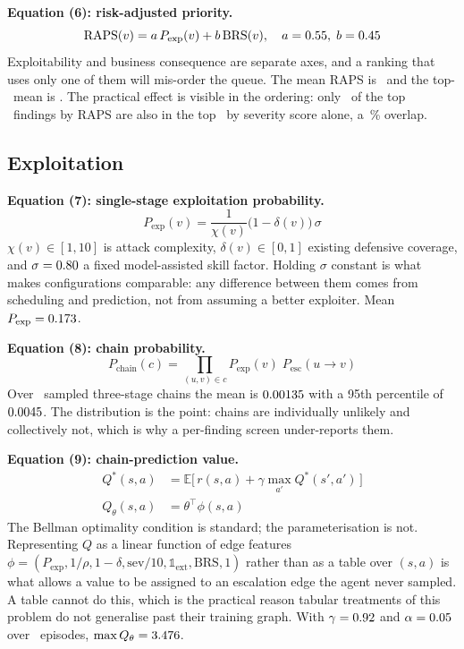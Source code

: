 \documentclass[journal]{IEEEtran}
\begin{document}
\textbf{Equation (6): risk-adjusted priority.}
\begin{equation}
  \mathrm{RAPS}(v) = a\,P_{\mathrm{exp}}(v) + b\,\mathrm{BRS}(v),
  \quad a=0.55,\; b=0.45
  \label{eq:raps}
\end{equation}
Exploitability and business consequence are separate axes, and a ranking that
uses only one of them will mis-order the queue. The mean RAPS is \rapsMean\
and the top-\topK\ mean is \rapsTop. The practical effect is visible in the
ordering: only \rankOverlap\ of the top \topK\ findings by RAPS are also in
the top \topK\ by severity score alone, a \rankOverlapPct\,\% overlap.

\subsection{Exploitation}

\textbf{Equation (7): single-stage exploitation probability.}
\begin{equation}
  P_{\mathrm{exp}}(v) = \frac{1}{\chi(v)}\bigl(1-\delta(v)\bigr)\,\sigma
  \label{eq:exploit}
\end{equation}
$\chi(v)\in[1,10]$ is attack complexity, $\delta(v)\in[0,1]$ existing defensive
coverage, and $\sigma=0.80$ a fixed model-assisted skill factor. Holding
$\sigma$ constant is what makes configurations comparable: any difference
between them comes from scheduling and prediction, not from assuming a better
exploiter. Mean $P_{\mathrm{exp}}=0.173$.

\textbf{Equation (8): chain probability.}
\begin{equation}
  P_{\mathrm{chain}}(c) = \prod_{(u,v)\in c}
      P_{\mathrm{exp}}(v)\; P_{\mathrm{esc}}(u \!\to\! v)
  \label{eq:chain}
\end{equation}
Over \nChains\ sampled three-stage chains the mean is $0.00135$ with a
95th percentile of $0.0045$. The distribution is the point: chains are
individually unlikely and collectively not, which is why a per-finding screen
under-reports them.

\textbf{Equation (9): chain-prediction value.}
\begin{equation}
  \begin{aligned}
    Q^{*}(s,a) &= \mathbb{E}\bigl[\,r(s,a)
        + \gamma \max_{a'} Q^{*}(s',a')\,\bigr]\\[1pt]
    Q_\theta(s,a) &= \theta^{\!\top}\phi(s,a)
  \end{aligned}
  \label{eq:rl}
\end{equation}
The Bellman optimality condition is standard; the parameterisation is not.
Representing $Q$ as a linear function of edge features
$\phi=(P_{\mathrm{exp}}, 1/\rho, 1-\delta, \mathrm{sev}/10,
\mathbb{1}_{\text{ext}}, \mathrm{BRS}, 1)$ rather than as a table over
$(s,a)$ is what allows a value to be assigned to an escalation edge the agent
never sampled. A table cannot do this, which is the practical reason
tabular treatments of this problem do not generalise past their training
graph. With $\gamma=0.92$ and $\alpha=0.05$ over \episodesQ\ episodes,
$\max Q_\theta = 3.476$.
\end{document}
